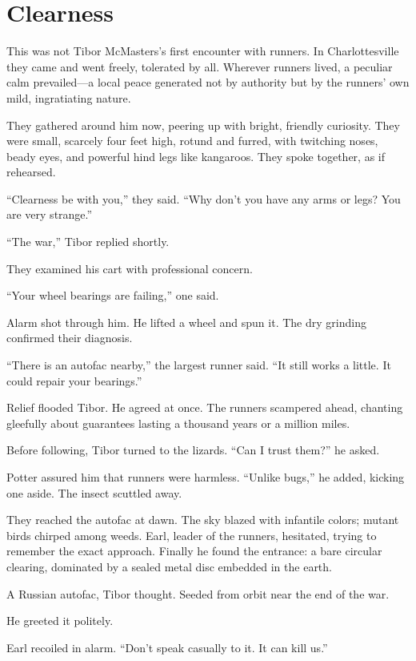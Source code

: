 \chapter{Clearness}

This was not Tibor McMasters’s first encounter with runners. In Charlottesville they came and went freely, tolerated by all. Wherever runners lived, a peculiar calm prevailed—a local peace generated not by authority but by the runners’ own mild, ingratiating nature.

They gathered around him now, peering up with bright, friendly curiosity. They were small, scarcely four feet high, rotund and furred, with twitching noses, beady eyes, and powerful hind legs like kangaroos. They spoke together, as if rehearsed.

“Clearness be with you,” they said. “Why don’t you have any arms or legs? You are very strange.”

“The war,” Tibor replied shortly.

They examined his cart with professional concern.

“Your wheel bearings are failing,” one said.

Alarm shot through him. He lifted a wheel and spun it. The dry grinding confirmed their diagnosis.

“There is an autofac nearby,” the largest runner said. “It still works a little. It could repair your bearings.”

Relief flooded Tibor. He agreed at once. The runners scampered ahead, chanting gleefully about guarantees lasting a thousand years or a million miles.

Before following, Tibor turned to the lizards. “Can I trust them?” he asked.

Potter assured him that runners were harmless. “Unlike bugs,” he added, kicking one aside. The insect scuttled away.

They reached the autofac at dawn. The sky blazed with infantile colors; mutant birds chirped among weeds. Earl, leader of the runners, hesitated, trying to remember the exact approach. Finally he found the entrance: a bare circular clearing, dominated by a sealed metal disc embedded in the earth.

A Russian autofac, Tibor thought. Seeded from orbit near the end of the war.

He greeted it politely.

Earl recoiled in alarm. “Don’t speak casually to it. It can kill us.”

